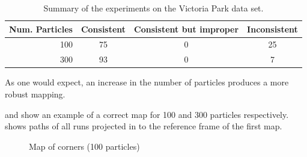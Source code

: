 \begin{table}[ht]
\center
\begin{tabular}{r|c|c|c}
Num. Particles & Consistent & Consistent but improper & Inconsistent\\
\hline
100 & 75  & 0 & 25 \\
300 & 93  & 0 & 7\\
\end{tabular}
\caption{Summary of the experiments on the Victoria Park data set.}
\label{tab:results_victoria_park}
\end{table}

As one would expect, an increase in the number of particles produces a
more robust mapping. 

 and  show
an example of a correct map for 100 and 300 particles
respectively.  shows paths of all runs
projected in to the reference frame of the first map.


\begin{figure}[htbp]
  \centering


  \caption{Map of corners (100 particles)} %
  \label{fig:trees_map_100p}
\end{figure}

